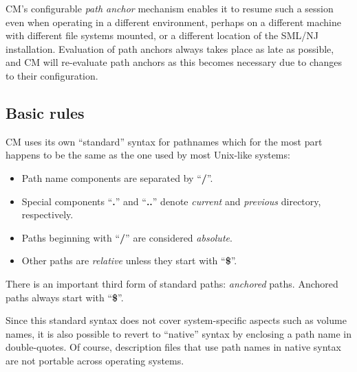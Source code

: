 \documentclass[titlepage,letterpaper]{article}
\begin{document}
CM's configurable {\em path anchor} mechanism enables it to resume
such a session even when operating in a different environment, perhaps
on a different machine with different file systems mounted, or a
different location of the SML/NJ installation.  Evaluation of path
anchors always takes place as late as possible, and CM will re-evaluate
path anchors as this becomes necessary due to changes to their
configuration.

\subsection{Basic rules}
\label{sec:basicrules}

CM uses its own ``standard'' syntax for pathnames which for the most
part happens to be the same as the one used by most Unix-like systems:
\begin{itemize}
\item Path name components are separated by ``{\bf /}''.
\item Special components ``{\bf .}'' and ``{\bf ..}'' denote {\em
current} and {\em previous} directory, respectively.
\item Paths beginning
with ``{\bf /}'' are considered {\em absolute}.
\item Other paths are {\em relative} unless they start with ``{\bf \$}''.
\end{itemize}
\noindent There is an important third form of standard paths: {\em
anchored} paths.  Anchored paths always start with ``{\bf \$}''.

Since this standard syntax does not cover system-specific aspects such
as volume names, it is also possible to revert to ``native'' syntax by
enclosing a path name in double-quotes.  Of course, description files
that use path names in native syntax are not portable across operating
systems.
\end{document}
